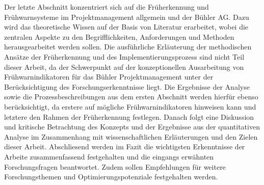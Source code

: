 \newline\newline
Der letzte Abschnitt konzentriert sich auf die Früherkennung und Frühwarnsysteme im Projektmanagement allgemein und der Bühler AG. Dazu wird das theoretische Wissen auf der Basis von Literatur erarbeitet, wobei die zentralen Aspekte zu den Begrifflichkeiten, Anforderungen und Methoden herausgearbeitet werden sollen. Die ausführliche Erläuterung der methodischen Ansätze der Früherkennung und des Implementierungsprozess sind nicht Teil dieser Arbeit, da der Schwerpunkt auf der konzeptionellen Ausarbeitung von Frühwarnindikatoren für das Bühler Projektmanagement unter der Berücksichtigung des Forschungserkenntnisse liegt. Die Ergebnisse der Analyse sowie die Prozessbeschreibungen aus dem ersten Abschnitt werden hierfür ebenso berücksichtigt, da erstere auf mögliche Frühwarnindikatoren hinweisen kann und letztere den Rahmen der Früherkennung festlegen. Danach folgt eine Diskussion und kritische Betrachtung des Konzepts und der Ergebnisse aus der quantitativen Analyse im Zusammenhang mit wissenschaftlichen Erläuterungen und den Zielen dieser Arbeit.
\newline\newline
Abschliesend werden im Fazit die wichtigsten Erkenntnisse der Arbeite zusammenfassend festgehalten und die eingangs erwähnten Forschungsfragen beantwortet. Zudem sollen Empfehlungen für weitere Forschungsthemen und Optimierungspotenziale festgehalten werden.

	




